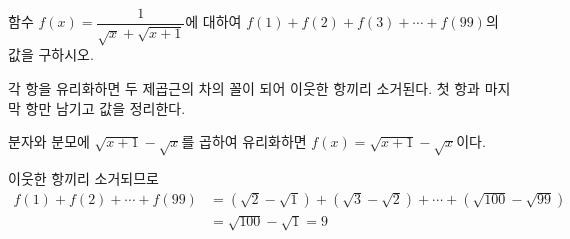 \documentclass[10pt]{article}
\begin{document}
\begin{dmproblem}
함수 $f(x) = \dfrac{1}{\sqrt{x} + \sqrt{x + 1}}$에 대하여 $f(1) + f(2) + f(3) + \cdots + f(99)$의 값을 구하시오.
\end{dmproblem}

\begin{dmapproach}
각 항을 유리화하면 두 제곱근의 차의 꼴이 되어 이웃한 항끼리 소거된다. 첫 항과 마지막 항만 남기고 값을 정리한다.
\end{dmapproach}

\begin{dmsolution}
분자와 분모에 $\sqrt{x + 1} - \sqrt{x}$를 곱하여 유리화하면 $f(x) = \sqrt{x + 1} - \sqrt{x}$이다.

이웃한 항끼리 소거되므로
\begin{align*}
  f(1) + f(2) + \cdots + f(99)
  &= (\sqrt{2} - \sqrt{1}) + (\sqrt{3} - \sqrt{2}) + \cdots + (\sqrt{100} - \sqrt{99}) \\
  &= \sqrt{100} - \sqrt{1} = 9
\end{align*}
\end{dmsolution}

\dmchecktitle



\newpage

\dmconcepthead
{}
\end{document}
